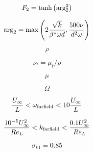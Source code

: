 {\newpage\clearpage
{}%
\begin{displaymath}
F_2 = {\rm tanh} \left({\rm arg}_2^2 \right)
\end{displaymath}%
\lthtmldisplayZ
\lthtmlcheckvsize\clearpage}

{\newpage\clearpage
{}%
\begin{displaymath}
{\rm arg}_2 = {\rm max} \left( 2 \frac{\sqrt{k}}{\beta^* \omega d}, \frac{500 \nu}{d^2 \omega} \right)
\end{displaymath}%
\lthtmldisplayZ
\lthtmlcheckvsize\clearpage}

{\newpage\clearpage
{}%
\begin{displaymath}
\rho
\end{displaymath}%
\lthtmldisplayZ
\lthtmlcheckvsize\clearpage}

{\newpage\clearpage
{}%
\begin{displaymath}
\nu_t = \mu_t/\rho
\end{displaymath}%
\lthtmldisplayZ
\lthtmlcheckvsize\clearpage}

{\newpage\clearpage
{}%
\begin{displaymath}
\mu
\end{displaymath}%
\lthtmldisplayZ
\lthtmlcheckvsize\clearpage}

{\newpage\clearpage
{}%
\begin{displaymath}
\Omega
\end{displaymath}%
\lthtmldisplayZ
\lthtmlcheckvsize\clearpage}

{\newpage\clearpage
{}%
\begin{displaymath}
\frac{U_{\infty}}{L} < \omega_{\rm farfield} < 10 \frac{U_{\infty}}{L}
\end{displaymath}%
\lthtmldisplayZ
\lthtmlcheckvsize\clearpage}

{\newpage\clearpage
{}%
\begin{displaymath}
\frac{10^{-5}U_{\infty}^2}{Re_L} < k_{\rm farfield} < \frac{0.1 U_{\infty}^2}{Re_L}
\end{displaymath}%
\lthtmldisplayZ
\lthtmlcheckvsize\clearpage}

{\newpage\clearpage
{}%
\begin{displaymath}
\sigma_{k 1} = 0.85
\end{displaymath}%
\lthtmldisplayZ
\lthtmlcheckvsize\clearpage}

